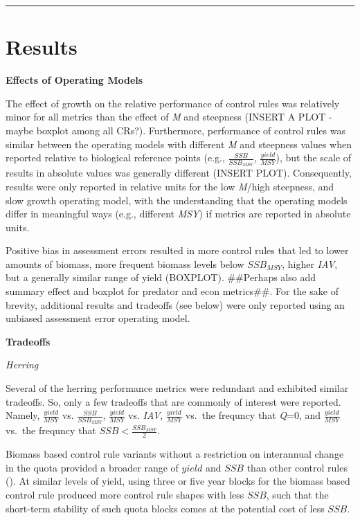 \documentclass[]{article}
\begin{document}
\begin{center}\rule{0.5\linewidth}{\linethickness}\end{center}

\section{Results}\label{results}

\textbf{Effects of Operating Models}

The effect of growth on the relative performance of control rules was
relatively minor for all metrics than the effect of \emph{M} and
steepness (INSERT A PLOT - maybe boxplot among all CRs?). Furthermore,
performance of control rules was similar between the operating models
with different \emph{M} and steepness values when reported relative to
biological reference points (e.g., \(\frac{SSB}{SSB_{MSY}}\),
\(\frac{yield}{MSY}\)), but the scale of results in absolute values was
generally different (INSERT PLOT). Consequently, results were only
reported in relative units for the low \emph{M}/high steepness, and slow
growth operating model, with the understanding that the operating models
differ in meaningful ways (e.g., different \emph{MSY}) if metrics are
reported in absolute units.

Positive bias in assessment errors resulted in more control rules that
led to lower amounts of biomass, more frequent biomass levels below
\(SSB_{MSY}\), higher \emph{IAV}, but a generally similar range of yield
(BOXPLOT). \#\#Perhaps also add summary effect and boxplot for predator
and econ metrics\#\#. For the sake of brevity, additional results and
tradeoffs (see below) were only reported using an unbiased assessment
error operating model.

\textbf{Tradeoffs}

\emph{Herring}

Several of the herring performance metrics were redundant and exhibited
similar tradeoffs. So, only a few tradeoffs that are commonly of
interest were reported. Namely, \(\frac{yield}{MSY}\) vs.
\(\frac{SSB}{SSB_{MSY}}\), \(\frac{yield}{MSY}\) vs. \emph{IAV},
\(\frac{yield}{MSY}\) vs.~the frequncy that \emph{Q}=0, and
\(\frac{yield}{MSY}\) vs.~the frequncy that
\(SSB < \frac{SSB_{MSY}}{2}\).

Biomass based control rule variants without a restriction on interannual
change in the quota provided a broader range of \(yield\) and \(SSB\)
than other control rules (). At similar levels of yield, using three or
five year blocks for the biomass based control rule produced more
control rule shapes with less \(SSB\), such that the short-term
stability of such quota blocks comes at the potential cost of less
\(SSB\).
\end{document}
